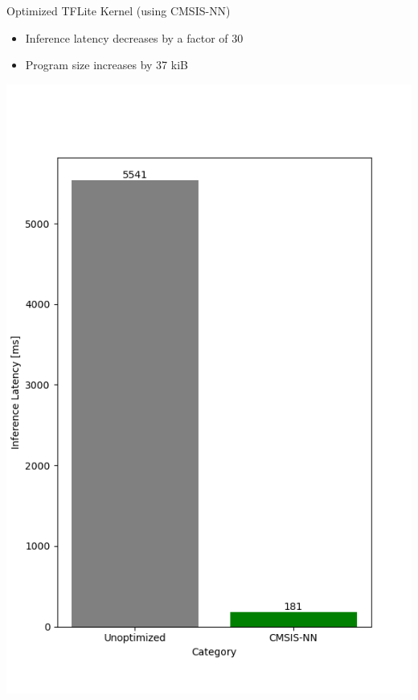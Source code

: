 \documentclass{beamer}
\begin{document}
\begin{frame}{Optimized TFLite Kernel (using CMSIS-NN)}
	\begin{minipage}{0.49\textwidth}
	\begin{itemize}
		\item<2->Inference latency decreases by a factor of 30
		\item<3->Program size increases by 37 kiB
	\end{itemize}
	\end{minipage}
	\begin{minipage}{0.49\textwidth}
	\includegraphics[width=\textwidth]{figures/optimization.png}
	\end{minipage}
\end{frame}
\end{document}
